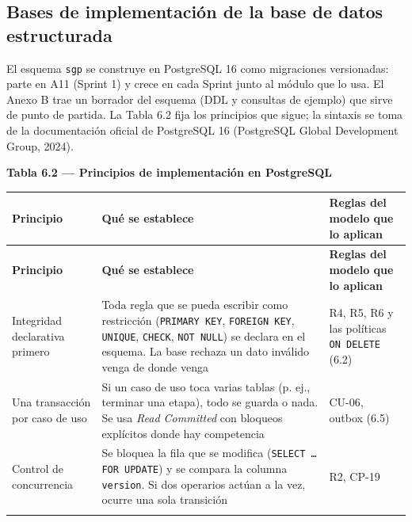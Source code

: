 \documentclass[11pt,a4paper]{article}
\begin{document}
\subsection{Bases de implementación de la base de datos estructurada}

El esquema \texttt{sgp} se construye en PostgreSQL 16 como migraciones versionadas: parte en A11 (Sprint 1) y crece en cada Sprint junto al módulo que lo usa. El Anexo B trae un borrador del esquema (DDL y consultas de ejemplo) que sirve de punto de partida. La Tabla 6.2 fija los principios que sigue; la sintaxis se toma de la documentación oficial de PostgreSQL 16 (PostgreSQL Global Development Group, 2024).

\textbf{Tabla 6.2 --- Principios de implementación en PostgreSQL}\nopagebreak

\begingroup
\begin{longtable}{@{}>{\raggedright\arraybackslash\hspace{0pt}}p{}>{\raggedright\arraybackslash\hspace{0pt}}p{}>{\raggedright\arraybackslash\hspace{0pt}}p{}@{}}
\toprule
\textbf{Principio} & \textbf{Qué se establece} & \textbf{Reglas del modelo que lo aplican} \\ \midrule
\endfirsthead
\toprule
\textbf{Principio} & \textbf{Qué se establece} & \textbf{Reglas del modelo que lo aplican} \\ \midrule
\endhead
\bottomrule
\endlastfoot
Integridad declarativa primero & Toda regla que se pueda escribir como restricción (\texttt{PRIMARY KEY}, \texttt{FOREIGN KEY}, \texttt{UNIQUE}, \texttt{CHECK}, \texttt{NOT NULL}) se declara en el esquema. La base rechaza un dato inválido venga de donde venga & R4, R5, R6 y las políticas \texttt{ON DELETE} (6.2) \\ \addlinespace[0.25em]
Una transacción por caso de uso & Si un caso de uso toca varias tablas (p. ej., terminar una etapa), todo se guarda o nada. Se usa \textit{Read Committed} con bloqueos explícitos donde hay competencia & \mbox{CU-06}, outbox (6.5) \\ \addlinespace[0.25em]
Control de concurrencia & Se bloquea la fila que se modifica (\texttt{SELECT \ldots{} FOR UPDATE}) y se compara la columna \texttt{version}. Si dos operarios actúan a la vez, ocurre una sola transición & R2, \mbox{CP-19} \\ \addlinespace[0.25em]

\end{longtable}
\end{document}
